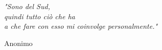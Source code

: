 \newlength\longest

\clearpage

\thispagestyle{empty}
\null\vfill

\settowidth{}
\begin{center}
    \parbox{\longest}{%
        \raggedright{\LARGE\itshape%
            "Sono del Sud,\\
            quindi tutto ciò che ha\\
            a che fare con esso mi coinvolge personalmente."\par\bigskip
        }
        \raggedleft\Large{Anonimo}\par%
    }
\end{center}


\vfill\vfill

\clearpage